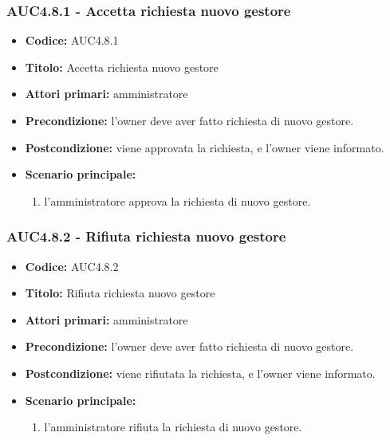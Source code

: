 \documentclass[casi-duso]{subfiles}
\begin{document}
\subsubsection{AUC4.8.1 - Accetta richiesta nuovo gestore}%
\label{subsub:AUC4.8.1}
\begin{itemize}
  \item \textbf{Codice:} AUC4.8.1
  \item \textbf{Titolo:} Accetta richiesta nuovo gestore
  \item \textbf{Attori primari:} amministratore
  \item \textbf{Precondizione:} l'owner deve aver fatto richiesta di nuovo gestore.
  \item \textbf{Postcondizione:} viene approvata la richiesta, e l'owner viene informato.
  \item \textbf{Scenario principale:}
  \begin{enumerate}
    \item l'amministratore approva la richiesta di nuovo gestore.
  \end{enumerate}
\end{itemize}  

\subsubsection{AUC4.8.2 - Rifiuta richiesta nuovo gestore}%
\label{subsub:AUC4.8.2}
\begin{itemize}
  \item \textbf{Codice:} AUC4.8.2
  \item \textbf{Titolo:} Rifiuta richiesta nuovo gestore
  \item \textbf{Attori primari:} amministratore
  \item \textbf{Precondizione:} l'owner deve aver fatto richiesta di nuovo gestore.
  \item \textbf{Postcondizione:} viene rifiutata la richiesta, e l'owner viene informato.
  \item \textbf{Scenario principale:}
  \begin{enumerate}
    \item l'amministratore rifiuta la richiesta di nuovo gestore.
  \end{enumerate}
\end{itemize}  
\end{document}
